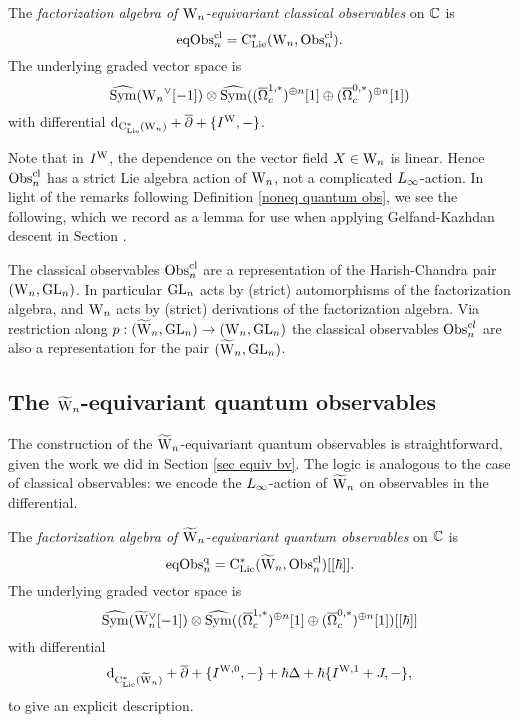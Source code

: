 \begin{dfn}
The \emph{factorization algebra of ${{\rm W}_n}$-equivariant classical observables} on $\mathbb C$ is
\[
{\rm eqObs}^{\rm cl}_n = {\rm C}_{\rm Lie}^*({{\rm W}_n}, {\rm Obs}^{\rm cl}_n).
\]
The underlying graded vector space is
\[
\widehat{{\rm Sym}}({{\rm W}_n}^\vee[-1]) \otimes \widehat{{\rm Sym}}((\overline{\Omega}^{1,*}_c)^{\oplus n}[1] \oplus (\overline{\Omega}^{0,*}_c)^{\oplus n}[1])
\]
with differential ${\rm d}_{{\rm C}_{\rm Lie}^*({{\rm W}_n})} + \overline{\partial} + \{I^{\rm W},-\}$.
\end{dfn}

Note that in $I^{\rm W}$, the dependence on the vector field $X \in {{\rm W}_n}$ is linear. 
Hence ${\rm Obs}^{\rm cl}_n$ has a strict Lie algebra action of ${{\rm W}_n}$, not a complicated $\L8$-action.
In light of the remarks following Definition \ref{noneq quantum obs}, we see the following,
which we record as a lemma for use when applying Gelfand-Kazhdan descent in Section \label{sec ss GK descent}.

\begin{lemma}
The classical observables ${\rm Obs}^{\rm cl}_n$ are a representation of the Harish-Chandra pair~$({{\rm W}_n},{\rm GL}_n)$.
In particular ${\rm GL}_n$ acts by (strict) automorphisms of the factorization algebra, and
${{\rm W}_n}$ acts by (strict) derivations of the factorization algebra. Via
restriction along $p : (\widetilde{{{\rm W}}}_n, {\rm GL}_n) \to ({{\rm W}_n}, {\rm GL}_n)$ the
classical observables ${\rm Obs}^{cl}_n$ are also a representation for the pair
$(\widetilde{{{\rm W}}}_n, {\rm GL}_n)$. 
\end{lemma}

\subsection{The $\widetilde{{{\rm W}}}_n$-equivariant quantum observables}

The construction of the $\widetilde{{{\rm W}}}_n$-equivariant quantum observables is straightforward,
given the work we did in Section \ref{sec equiv bv}.
The logic is analogous to the case of classical observables:
we encode the $\L8$-action of $\widetilde{{{\rm W}}}_n$ on observables in the differential.

\begin{dfn}
The \emph{factorization algebra of $\widetilde{{{\rm W}}}_n$-equivariant quantum observables} on $\mathbb C$ is
\[
{\rm eqObs}^{\rm q}_n = {\rm C}_{\rm Lie}^*(\widetilde{{{\rm W}}}_n, {\rm Obs}^{\rm cl}_n)[[\hbar]].
\]
The underlying graded vector space is
\[
\widehat{{\rm Sym}}(\widetilde{{{\rm W}}}_n^\vee[-1]) \otimes \widehat{{\rm Sym}}((\overline{\Omega}^{1,*}_c)^{\oplus n}[1] \oplus (\overline{\Omega}^{0,*}_c)^{\oplus n}[1])[[\hbar]]
\]
with differential 
\[
{\rm d}_{{\rm C}_{\rm Lie}^*(\widetilde{{{\rm W}}}_n)} + \overline{\partial} + \{I^{\rm W,0},-\} + \hbar \Delta + \hbar \{I^{\rm W,1}+J,-\},
\]
to give an explicit description.
\end{dfn}

